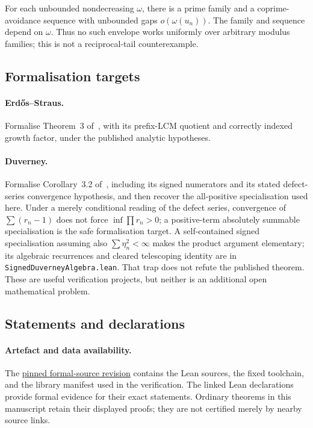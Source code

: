 \noindent For each unbounded nondecreasing $\omega$, there is a prime family
and a coprime-avoidance sequence with unbounded gaps $o(\omega(u_n))$.
The family and sequence depend on $\omega$.  Thus no such envelope works
uniformly over arbitrary modulus families; this is not a reciprocal-tail
counterexample.

\subsection*{Formalisation targets}

\paragraph{Erd\H{o}s--Straus.}
Formalise Theorem~3 of~\cite{erdosstraus1964}, with its prefix-LCM quotient
and correctly indexed growth factor, under the published analytic hypotheses.

\paragraph{Duverney.}
Formalise Corollary~3.2 of~\cite{duverney2001}, including its signed
numerators and its stated defect-series convergence hypothesis, and then
recover the all-positive specialisation used here.  Under a merely conditional reading of
the defect series, convergence of $\sum(r_n-1)$ does not force
$\inf\prod r_n>0$; a positive-term absolutely summable specialisation is the
safe formalisation target.  A self-contained signed specialisation assuming
also $\sum\eta_n^2<\infty$ makes the product argument elementary; its algebraic
recurrences and cleared telescoping identity are in
\texttt{SignedDuverneyAlgebra.lean}.  That trap does not refute the published
theorem.  These are useful verification projects, but neither is an additional
open mathematical problem.

\subsection*{Statements and declarations}

\paragraph{Artefact and data availability.} The
\href{\sourceurl}{pinned formal-source revision} contains the Lean sources, the
fixed toolchain, and the library manifest used in the verification.  The linked Lean declarations provide formal evidence for their exact
statements.  Ordinary theorems in this manuscript retain their displayed
proofs; they are not certified merely by nearby source links.

